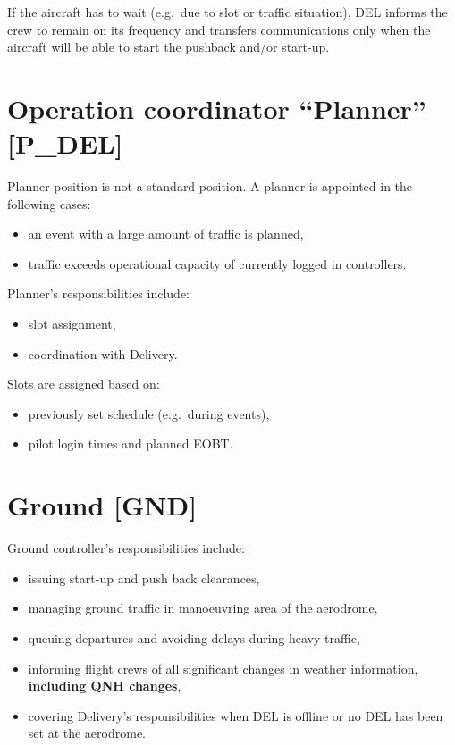 If the aircraft has to wait (e.g.\ due to slot or traffic situation), DEL informs the crew to remain on its frequency and transfers communications only when the aircraft will be able to start the pushback and/or start-up.

\section{Operation coordinator ``Planner'' [P\_DEL]}

Planner position is not a standard position. A planner is appointed in the following cases:
\begin{itemize}
    \item an event with a large amount of traffic is planned,
    \item traffic exceeds operational capacity of currently logged in controllers.
\end{itemize}

Planner's responsibilities include:
\begin{itemize}
    \item slot assignment,
    \item coordination with Delivery.
\end{itemize}

Slots are assigned based on:
\begin{itemize}
    \item previously set schedule (e.g.\ during events),
    \item pilot login times and planned EOBT.\@
\end{itemize}

\section{Ground [GND]}

Ground controller's responsibilities include:
\begin{itemize}
    \item issuing start-up and push back clearances,
    \item managing ground traffic in manoeuvring area of the aerodrome,
    \item queuing departures and avoiding delays during heavy traffic,
    \item informing flight crews of all significant changes in weather information, \textbf{including QNH changes},
    \item covering Delivery's responsibilities when DEL is offline or no DEL has been set at the aerodrome.
\end{itemize}

